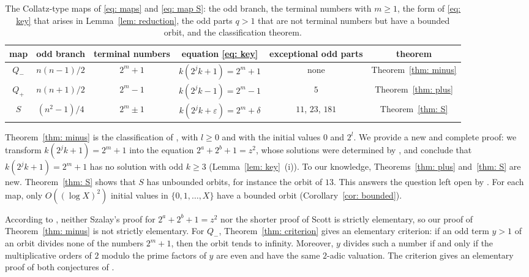 \documentclass{article}
\newcommand{\Ge}{\geqslant}
\begin{document}
\begin{table}[!ht]
\centering
\begin{tabular}{cccccc}
\toprule
map & odd branch & terminal numbers & equation \eqref{eq: key} & exceptional odd parts & theorem \\
\midrule
$Q_-$ & $n(n-1)/2$ & $2^m + 1$ & $k (2^j k + 1) = 2^m + 1$ & none & Theorem~\ref{thm: minus} \\
$Q_+$ & $n(n+1)/2$ & $2^m - 1$ & $k (2^j k - 1) = 2^m - 1$ & $5$ & Theorem~\ref{thm: plus} \\
$S$ & $(n^2 - 1)/4$ & $2^m \pm 1$ & $k (2^j k + \varepsilon) = 2^m + \delta$ & $11$, $23$, $181$ & Theorem~\ref{thm: S} \\
\bottomrule
\end{tabular}
\caption{The Collatz-type maps of \eqref{eq: maps} and \eqref{eq: map S}: the odd branch, the terminal numbers with $m \Ge 1$, the form of \eqref{eq: key} that arises in Lemma~\ref{lem: reduction}, the odd parts $q > 1$ that are not terminal numbers but have a bounded orbit, and the classification theorem.}
\label{tab: maps}
\end{table}

Theorem~\ref{thm: minus} is the classification of \citet[Theorem~3]{sedaghat2020dual}, with $l \Ge 0$ and with the initial values $0$ and $2^l$. We provide a new and complete proof: we transform $k(2^j k + 1) = 2^m + 1$ into the equation $2^a + 2^b + 1 = z^2$, whose solutions were determined by \citet{szalay2002equations}, and conclude that $k(2^j k + 1) = 2^m + 1$ has no solution with odd $k \Ge 3$ (Lemma~\ref{lem: key}~(i)). To our knowledge, Theorems~\ref{thm: plus} and~\ref{thm: S} are new. Theorem~\ref{thm: S} shows that $S$ has unbounded orbits, for instance the orbit of $13$. This answers the question left open by \citet{sedaghat2020bounded}. For each map, only $O((\log X)^2)$ initial values in $\{0, 1, \dots, X\}$ have a bounded orbit (Corollary~\ref{cor: bounded}).

According to \citet[Section~1]{scott2006elementary}, neither Szalay's proof for $2^a + 2^b + 1 = z^2$ nor the shorter proof of Scott is strictly elementary, so our proof of Theorem~\ref{thm: minus} is not strictly elementary. For $Q_-$, Theorem~\ref{thm: criterion} gives an elementary criterion: if an odd term $y > 1$ of an orbit divides none of the numbers $2^m + 1$, then the orbit tends to infinity. Moreover, $y$ divides such a number if and only if the multiplicative orders of $2$ modulo the prime factors of $y$ are even and have the same $2$-adic valuation. The criterion gives an elementary proof of both conjectures of \citet{sedaghat2020bounded}.
\end{document}
